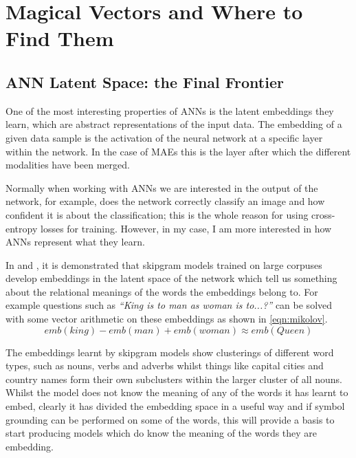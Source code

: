 
\chapter{Magical Vectors and Where to Find Them} %

\label{Chapter5} %


\section{ANN Latent Space: the Final Frontier}
One of the most interesting properties of \acp{ANN} is the latent embeddings they learn, which are abstract representations of the input data. The embedding of a given data sample is the activation of the neural network at a specific layer within the network. In the case of \acp{MAE} this is the layer after which the different modalities have been merged.

Normally when working with \acp{ANN} we are interested in the output of the network, for example, does the network correctly classify an image and how confident it is about the classification; this is the whole reason for using cross-entropy losses for training. However, in my case, I am more interested in how \acp{ANN} represent what they learn.

In \cite{mikolov2013distributed} and \cite{mikolov2013efficient}, it is demonstrated that skipgram models trained on large corpuses develop embeddings in the latent space of the network which tell us something about the relational meanings of the words the embeddings belong to. For example questions such as \textit{``King is to man as woman is to...?''} can be solved with some vector arithmetic on these embeddings as shown in \autoref{eqn:mikolov}.
\begin{equation}
emb(king) - emb(man) + emb(woman) \approx emb(Queen)
\label{eqn:mikolov}
\end{equation} 

The embeddings learnt by skipgram models show clusterings of different word types, such as nouns, verbs and adverbs whilst things like capital cities and country names form their own subclusters within the larger cluster of all nouns. Whilst the model does not know the meaning of any of the words it has learnt to embed, clearly it has divided the embedding space in a useful way and if symbol grounding can be performed on some of the words, this will provide a basis to start producing models which do know the meaning of the words they are embedding.

